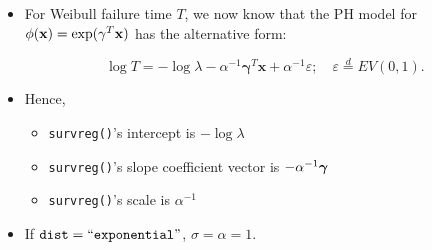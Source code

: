 \documentclass{beamer}
\newenvironment{wideitemize}%
  {\begin{itemize}%
    \setlength{\parskip}{1em}}%
  {\end{itemize}}
\newcommand{\boldgamma}{{\boldsymbol \gamma}}
\begin{document}
\begin{frame}
\begin{wideitemize}
\item
For Weibull failure time $T$, we now  know that the PH model for $\phi({\bf x}) = \exp( \gamma^T {\bf x})$ has the alternative form:

\[\log T=-\log\lambda-\alpha^{-1}\boldgamma^T\mathbf{x}+
\alpha^{-1}\varepsilon;  \quad \varepsilon\stackrel{d}{=}EV(0,1).\]

\item Hence, 
\begin{itemize}
\item \texttt{survreg()}'s intercept is $- \log \lambda$

\item \texttt{survreg()}'s slope coefficient vector is $-\alpha^{-1}\mbox{\boldmath $\gamma$}$

\item \texttt{survreg()}'s scale is $\alpha^{-1}$
\end{itemize}
%

\item If $\texttt{dist} =  ``\texttt{exponential}"$, $\sigma = \alpha = 1$.
\end{wideitemize}

\end{frame}
\end{document}
